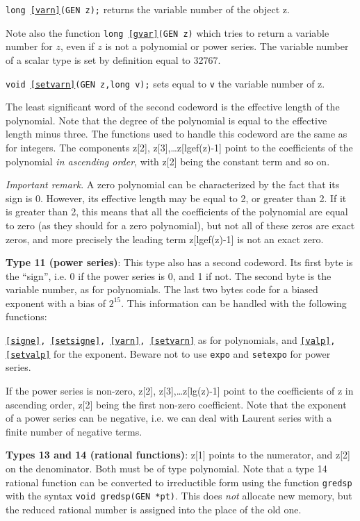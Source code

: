 {\tt long \ref{varn}(GEN z);} returns the variable number of the object z.

Note also the function {\tt long \ref{gvar}(GEN z)} which tries to return a variable number
for $z$, even if $z$ is not a polynomial or power series. The variable number of
a scalar type is set by definition equal to 32767.

{\tt void \ref{setvarn}(GEN z,long v);} sets equal to {\tt v} the variable number of z.

The least significant word of the second codeword is the effective length of
the polynomial. Note that the degree of the polynomial is equal to the effective
length minus three. The functions used to handle this codeword are the same
as for integers. The components z[2], z[3],\dots z[lgef(z)-1]
point to the coefficients of the polynomial {\it in ascending order\/}, with
z[2] being the constant term and so on.

{\sl Important remark\/}. A zero polynomial can be characterized by the fact
that its sign is 0. However, its effective length may be equal to 2, or greater
than 2. If it is greater than 2, this means that all the coefficients of the
polynomial are equal to zero (as they should for a zero polynomial), but not
all of these zeros are exact zeros, and more precisely the leading term
z[lgef(z)-1] is not an exact zero.

{\bf Type 11 (power series)}: 
This type also has a second codeword.
Its first byte is the ``sign'', i.e. 0 if the power series
is 0, and 1 if not. The second byte is the variable number, as for polynomials.
The last two bytes code for a biased exponent with a bias of
$2^{15}$. This information can be handled with the following functions:

{\tt \ref{signe}, \ref{setsigne}, \ref{varn}, \ref{setvarn}} as for 
polynomials, and {\tt \ref{valp}, \ref{setvalp}} for
the exponent. Beware not to use {\tt expo} and {\tt setexpo} for power series.

If the power series is non-zero, z[2], z[3],\dots z[lg(z)-1] point to the
coefficients of z in ascending order, z[2] being the first non-zero coefficient.
Note that the exponent of a power series can be negative, i.e. we can deal with
Laurent series with a finite number of negative terms.

{\bf Types 13 and 14 (rational functions)}: 
z[1] points to the numerator, and z[2] on the denominator. Both must be
of type polynomial. Note that a type 14 rational function can be
converted to irreductible form using the function {\tt gredsp} with the 
syntax {\tt void gredsp(GEN *pt)}. This does {\it not\/} allocate new 
memory, but the reduced rational number is assigned into the place of
the old one.

